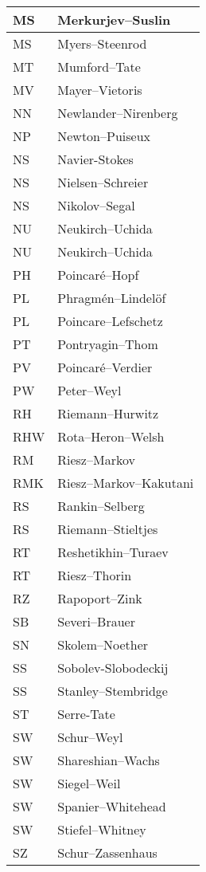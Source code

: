 \documentclass{amsart}
\numberwithin{equation}{section}
\theoremstyle{plain}
\numberwithin{equation}{section}
\theoremstyle{remark}
\begin{document}
\begin{longtable}{l|l}
MS & Merkurjev--Suslin\\ \hline
MS & Myers--Steenrod\\ \hline
MT & Mumford--Tate\\ \hline
MV & Mayer--Vietoris\\ \hline
NN & Newlander--Nirenberg\\ \hline
NP & Newton--Puiseux\\ \hline
NS & Navier-Stokes\\ \hline
NS & Nielsen--Schreier\\ \hline
NS & Nikolov--Segal\\ \hline
NU & Neukirch--Uchida\\ \hline
NU & Neukirch--Uchida\\ \hline
PH & Poincaré--Hopf\\ \hline
PL & Phragmén--Lindelöf\\ \hline
PL & Poincare--Lefschetz\\ \hline
PT & Pontryagin--Thom\\ \hline
PV & Poincaré--Verdier\\ \hline
PW & Peter--Weyl\\ \hline
RH & Riemann--Hurwitz\\ \hline
RHW & Rota--Heron--Welsh\\ \hline
RM & Riesz--Markov\\ \hline
RMK & Riesz--Markov--Kakutani\\ \hline
RS & Rankin--Selberg\\ \hline
RS & Riemann--Stieltjes\\ \hline
RT & Reshetikhin--Turaev\\ \hline
RT & Riesz--Thorin\\ \hline
RZ & Rapoport--Zink\\ \hline
SB & Severi--Brauer\\ \hline
SN & Skolem--Noether\\ \hline
SS & Sobolev-Slobodeckij\\ \hline
SS & Stanley--Stembridge\\ \hline
ST & Serre-Tate\\ \hline
SW & Schur--Weyl\\ \hline
SW & Shareshian--Wachs\\ \hline
SW & Siegel--Weil\\ \hline
SW & Spanier--Whitehead\\ \hline
SW & Stiefel--Whitney\\ \hline
SZ & Schur--Zassenhaus\\ \hline

\end{longtable}
\end{document}

